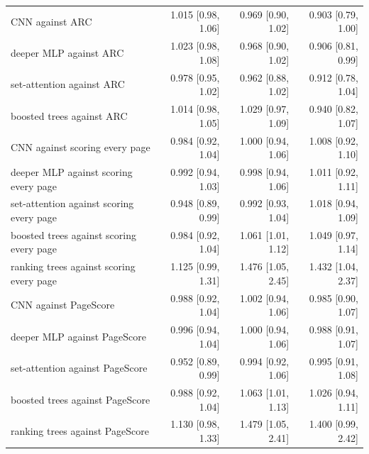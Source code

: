 \begin{tabular}{lrrr}
CNN against ARC & 1.015 [0.98, 1.06] & 0.969 [0.90, 1.02] & 0.903 [0.79, 1.00] \\
deeper MLP against ARC & 1.023 [0.98, 1.08] & 0.968 [0.90, 1.02] & 0.906 [0.81, 0.99] \\
set-attention against ARC & 0.978 [0.95, 1.02] & 0.962 [0.88, 1.02] & 0.912 [0.78, 1.04] \\
boosted trees against ARC & 1.014 [0.98, 1.05] & 1.029 [0.97, 1.09] & 0.940 [0.82, 1.07] \\
CNN against scoring every page & 0.984 [0.92, 1.04] & 1.000 [0.94, 1.06] & 1.008 [0.92, 1.10] \\
deeper MLP against scoring every page & 0.992 [0.94, 1.03] & 0.998 [0.94, 1.06] & 1.011 [0.92, 1.11] \\
set-attention against scoring every page & 0.948 [0.89, 0.99] & 0.992 [0.93, 1.04] & 1.018 [0.94, 1.09] \\
boosted trees against scoring every page & 0.984 [0.92, 1.04] & 1.061 [1.01, 1.12] & 1.049 [0.97, 1.14] \\
ranking trees against scoring every page & 1.125 [0.99, 1.31] & 1.476 [1.05, 2.45] & 1.432 [1.04, 2.37] \\
CNN against PageScore & 0.988 [0.92, 1.04] & 1.002 [0.94, 1.06] & 0.985 [0.90, 1.07] \\
deeper MLP against PageScore & 0.996 [0.94, 1.04] & 1.000 [0.94, 1.06] & 0.988 [0.91, 1.07] \\
set-attention against PageScore & 0.952 [0.89, 0.99] & 0.994 [0.92, 1.06] & 0.995 [0.91, 1.08] \\
boosted trees against PageScore & 0.988 [0.92, 1.04] & 1.063 [1.01, 1.13] & 1.026 [0.94, 1.11] \\
ranking trees against PageScore & 1.130 [0.98, 1.33] & 1.479 [1.05, 2.41] & 1.400 [0.99, 2.42] \\
\bottomrule
\end{tabular}
